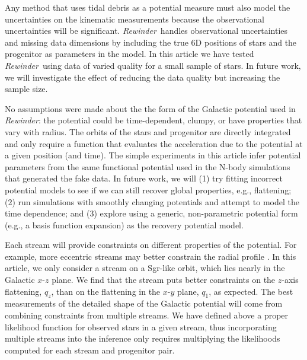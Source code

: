 \documentclass[letterpaper,12pt,preprint]{aastex}
\newcommand{\rewinder}{\emph{Rewinder}}
\begin{document}
Any method that uses tidal debris as a potential measure must also model the uncertainties on the kinematic measurements because the observational uncertainties will be significant. \rewinder\ handles observational uncertainties and missing data dimensions by including the true 6D positions of stars and the progenitor as parameters in the model. In this article we have tested \rewinder\ using data of varied quality for a small sample of stars. In future work, we will investigate the effect of reducing the data quality but increasing the sample size.

No assumptions were made about the the form of the Galactic potential used in \rewinder: the potential could be time-dependent, clumpy, or have properties that vary with radius. The orbits of the stars and progenitor are directly integrated and only require a function that evaluates the acceleration due to the potential at a given position (and time). The simple experiments in this article infer potential parameters from the same functional potential used in the N-body simulations that generated the fake data. In future work, we will (1) try fitting incorrect potential models to see if we can still recover global properties, e.g., flattening; (2) run simulations with smoothly changing potentials \citep[e.g.,][]{buist14} and attempt to model the time dependence; and (3) explore using a generic, non-parametric potential form (e.g., a basis function expansion) as the recovery potential model. 

Each stream will provide constraints on different properties of the potential. For example, more eccentric streams may better constrain the radial profile \citep[see][who illustrate the power of using multiple streams to simultaneously constrain the potential using orbit fitting]{deg14}. In this article, we only consider a stream on a Sgr-like orbit, which lies nearly in the Galactic $x$-$z$ plane. We find that the stream puts better constraints on the $z$-axis flattening, $q_z$, than on the flattening in the $x$-$y$ plane, $q_1$, as expected. The best measurements of the detailed shape of the Galactic potential will come from combining constraints from multiple streams. We have defined above a proper likelihood function for observed stars in a given stream, thus incorporating multiple streams into the inference only requires multiplying the likelihoods computed for each stream and progenitor pair.
\end{document}
